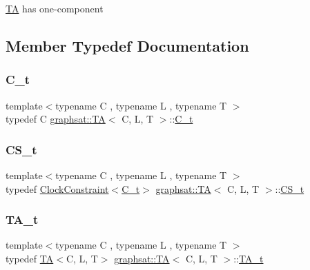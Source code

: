 \mbox{\hyperlink{classgraphsat_1_1_t_a}{TA}} has one-\/component 

\subsection{Member Typedef Documentation}
\mbox{\label{classgraphsat_1_1_t_a_afa30a66edcc3f3f9126c70aa82db1ea3}} 
\subsubsection{\texorpdfstring{C\_t}{C\_t}}
{\footnotesize\ttfamily template$<$typename C , typename L , typename T $>$ \\
typedef C \mbox{\hyperlink{classgraphsat_1_1_t_a}{graphsat\+::\+TA}}$<$ C, L, T $>$\+::\mbox{\hyperlink{classgraphsat_1_1_t_a_afa30a66edcc3f3f9126c70aa82db1ea3}{C\+\_\+t}}\hspace{0.3cm}{\ttfamily [private]}}

\mbox{\label{classgraphsat_1_1_t_a_a2a1d47f0a2945d673fc15125b3ff2f25}} 
\subsubsection{\texorpdfstring{CS\_t}{CS\_t}}
{\footnotesize\ttfamily template$<$typename C , typename L , typename T $>$ \\
typedef \mbox{\hyperlink{classgraphsat_1_1_clock_constraint}{Clock\+Constraint}}$<$\mbox{\hyperlink{classgraphsat_1_1_t_a_afa30a66edcc3f3f9126c70aa82db1ea3}{C\+\_\+t}}$>$ \mbox{\hyperlink{classgraphsat_1_1_t_a}{graphsat\+::\+TA}}$<$ C, L, T $>$\+::\mbox{\hyperlink{classgraphsat_1_1_t_a_a2a1d47f0a2945d673fc15125b3ff2f25}{C\+S\+\_\+t}}\hspace{0.3cm}{\ttfamily [private]}}

\mbox{\label{classgraphsat_1_1_t_a_a4ebfe8e97e7ce6681d5f237e322c4a77}} 
\subsubsection{\texorpdfstring{TA\_t}{TA\_t}}
{\footnotesize\ttfamily template$<$typename C , typename L , typename T $>$ \\
typedef \mbox{\hyperlink{classgraphsat_1_1_t_a}{TA}}$<$C, L, T$>$ \mbox{\hyperlink{classgraphsat_1_1_t_a}{graphsat\+::\+TA}}$<$ C, L, T $>$\+::\mbox{\hyperlink{classgraphsat_1_1_t_a_a4ebfe8e97e7ce6681d5f237e322c4a77}{T\+A\+\_\+t}}\hspace{0.3cm}{\ttfamily [private]}}

